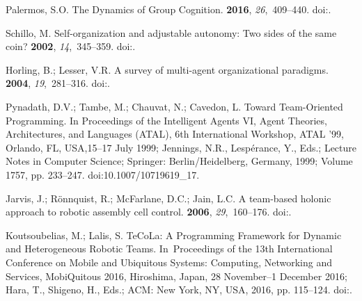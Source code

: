 \documentclass[jsan,article,accept,moreauthors,pdftex]{Definitions/mdpi}
\begin{document}
\begin{thebibliography}{999}
Palermos, S.O.
\newblock The Dynamics of Group Cognition.
 {\bf 2016}, {\em 26},~409--440.
\newblock
  doi:{\href{https://doi.org/10.1007/s11023-016-9402-5}{}}.

Schillo, M.
\newblock Self-organization and adjustable autonomy: Two sides of the same
  coin?
 {\bf 2002}, {\em 14},~345--359.
\newblock
  doi:{\href{https://doi.org/10.1080/0954009021000068718}{}}.

Horling, B.; Lesser, V.R.
\newblock A survey of multi-agent organizational paradigms.
 {\bf 2004}, {\em 19},~281--316.
\newblock
  doi:{\href{https://doi.org/10.1017/S0269888905000317}{}}.

Pynadath, D.V.; Tambe, M.; Chauvat, N.; Cavedon, L.
\newblock Toward Team-Oriented Programming.
\newblock   In Proceedings of the Intelligent Agents VI, Agent Theories, Architectures, and Languages
  (ATAL), 6th International Workshop, {ATAL} '99, Orlando, FL, USA,15--17 July
1999; Jennings, N.R., Lesp{\'{e}}rance, Y., Eds.;  Lecture Notes in Computer Science; 
  Springer: Berlin/Heidelberg, Germany, %
  1999; Volume 1757,  pp.
  233--247.
\newblock
  doi:10.1007/10719619\_17.

Jarvis, J.; R{\"{o}}nnquist, R.; McFarlane, D.C.; Jain, L.C.
\newblock A team-based holonic approach to robotic assembly cell control.
 {\bf 2006}, {\em 29},~160--176.
\newblock
  doi:{\href{https://doi.org/10.1016/j.jnca.2004.10.001}{}}.

Koutsoubelias, M.; Lalis, S.
\newblock TeCoLa: {A} Programming Framework for Dynamic and Heterogeneous
  Robotic Teams.
\newblock  In~Proceedings of the 13th International Conference on Mobile and
  Ubiquitous Systems: Computing, Networking and Services, MobiQuitous 2016,
  Hiroshima, Japan, 28 November--1 December 2016; Hara, T., Shigeno, H., Eds.;
  ACM: New York, NY, USA, 2016, pp. 115--124.
\newblock
  doi:{\href{https://doi.org/10.1145/2994374.2994397}{}}.


\end{thebibliography}
\end{document}
